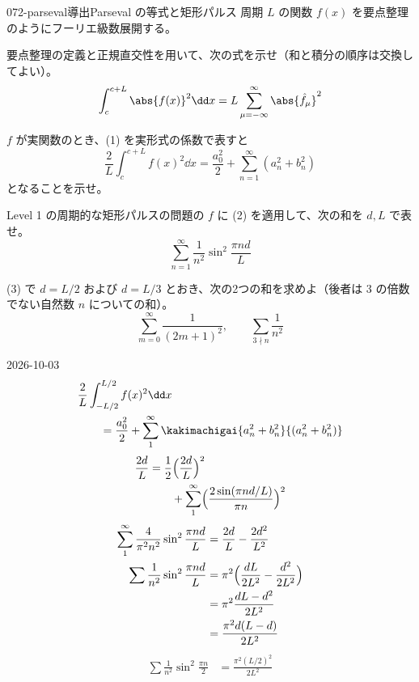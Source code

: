 \documentclass[uplatex,dvipdfmx,a4paper,11pt]{jsarticle}
\begin{document}
\begin{mondai}{072-parseval}{導出}{Parseval の等式と矩形パルス}
周期 $L$ の関数 $f(x)$ を要点整理のようにフーリエ級数展開する。
\begin{shoumon}
  \item 要点整理の定義と正規直交性を用いて、次の式を示せ（和と積分の順序は交換してよい）。
\[
\int_{c}^{c+L}\abs{f(x)}^{2}\dd x=L\sum_{\mu=-\infty}^{\infty}\abs{\hat{f}_{\mu}}^{2}
\]
  \item $f$ が実関数のとき、(1) を実形式の係数で表すと
\[
\frac{2}{L}\int_{c}^{c+L}f(x)^{2}\dd x=\frac{a_0^{2}}{2}+\sum_{n=1}^{\infty}(a_n^{2}+b_n^{2})
\]
となることを示せ。
  \item Level 1 の周期的な矩形パルスの問題の $f$ に (2) を適用して、次の和を $d,L$ で表せ。
\[
\sum_{n=1}^{\infty}\frac{1}{n^{2}}\sin^{2}\frac{\pi nd}{L}
\]
  \item (3) で $d=L/2$ および $d=L/3$ とおき、次の2つの和を求めよ（後者は $3$ の倍数でない自然数 $n$ についての和）。
\[
\sum_{m=0}^{\infty}\frac{1}{(2m+1)^{2}},\qquad\sum_{3\nmid n}\frac{1}{n^{2}}
\]
\end{shoumon}
\begin{kotaeutsushi}{2026-10-03}
\mikai
{}
\mikai
{}
\begin{align*}
  &\frac{2}{L}\int_{-L/2}^{L/2}f(x)^{2}\dd x\\
  &\qquad=\frac{a_0^{2}}{2}+\sum_{1}^{\infty}\kakimachigai{a_n^{2}+b_n^{2}}{(a_n^{2}+b_n^{2})}
\end{align*}
\begin{align*}
  \frac{2d}{L}&=\frac{1}{2}\Bigl(\frac{2d}{L}\Bigr)^{2}\\
  &\qquad+\sum_{1}^{\infty}\Bigl(\frac{2\sin(\pi nd/L)}{\pi n}\Bigr)^{2}
\end{align*}
\begin{align*}
  \sum_{1}^{\infty}\frac{4}{\pi^{2}n^{2}}\sin^{2}\frac{\pi nd}{L}&=\frac{2d}{L}-\frac{2d^{2}}{L^{2}}\\
  \sum\frac{1}{n^{2}}\sin^{2}\frac{\pi nd}{L}&=\pi^{2}\Bigl(\frac{dL}{2L^{2}}-\frac{d^{2}}{2L^{2}}\Bigr)\\
  &=\pi^{2}\frac{dL-d^{2}}{2L^{2}}\\
  &=\frac{\pi^{2}d(L-d)}{2L^{2}}
\end{align*}
\begin{align*}
  \sum\frac{1}{n^{2}}\sin^{2}\frac{\pi n}{2}&=\frac{\pi^{2}(L/2)^{2}}{2L^{2}}\\

\end{align*}
\end{kotaeutsushi}
\end{mondai}
\end{document}
